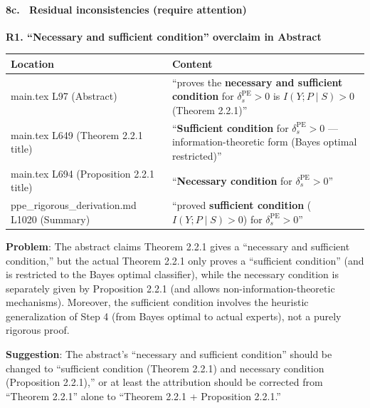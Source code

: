 \documentclass[
  12pt,
]{article}
\begin{document}
\paragraph{8c. \warning\ Residual inconsistencies (require attention)}\label{residual-inconsistencies}

\textbf{R1. ``Necessary and sufficient condition'' overclaim in Abstract}

\begin{longtable}[]{@{}
  >{\raggedright\arraybackslash}p{}
  >{\raggedright\arraybackslash}p{}@{}}
\toprule\noalign{}
\begin{minipage}[b]{\linewidth}\raggedright
Location
\end{minipage} & \begin{minipage}[b]{\linewidth}\raggedright
Content
\end{minipage} \\
\midrule\noalign{}
\endhead
\bottomrule\noalign{}
\endlastfoot
main.tex L97 (Abstract) & ``proves the \textbf{necessary and sufficient condition} for $\delta_s^{\text{PE}} > 0$ is $I(Y; P \mid S) > 0$ (Theorem 2.2.1)'' \\
main.tex L649 (Theorem 2.2.1 title) & ``\textbf{Sufficient condition} for $\delta_s^{\text{PE}} > 0$ --- information-theoretic form (Bayes optimal restricted)'' \\
main.tex L694 (Proposition 2.2.1 title) & ``\textbf{Necessary condition} for $\delta_s^{\text{PE}} > 0$'' \\
ppe\_rigorous\_derivation.md L1020 (Summary) & ``proved \textbf{sufficient condition} ($I(Y; P \mid S) > 0$) for $\delta_s^{\text{PE}} > 0$'' \\
\end{longtable}

\textbf{Problem}: The abstract claims Theorem 2.2.1 gives a ``necessary and sufficient condition,'' but the actual Theorem 2.2.1 only proves a ``sufficient condition'' (and is restricted to the Bayes optimal classifier), while the necessary condition is separately given by Proposition 2.2.1 (and allows non-information-theoretic mechanisms). Moreover, the sufficient condition involves the heuristic generalization of Step 4 (from Bayes optimal to actual experts), not a purely rigorous proof.

\textbf{Suggestion}: The abstract's ``necessary and sufficient condition'' should be changed to ``sufficient condition (Theorem 2.2.1) and necessary condition (Proposition 2.2.1),'' or at least the attribution should be corrected from ``Theorem 2.2.1'' alone to ``Theorem 2.2.1 + Proposition 2.2.1.''
\end{document}
